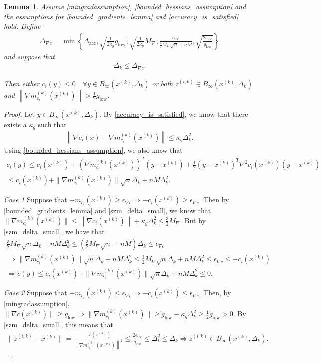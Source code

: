 \documentclass{article}
\newtheorem{lemma}[theorem]{Lemma}
\theoremstyle{case}
\newcommand{\dacc}{{\Delta_{\text{acc}}}}
\newcommand{\dk}{\Delta_k}
\newcommand{\gmcik}{{\nabla m_{c_i}^{(k)}\left(\xk\right)}}
\newcommand{\maxgrad}{{M_{\nabla}}}
\newcommand{\mingraddelta}{{\Delta_{\nabla c}}}
\newcommand{\mingradepsilon}{{\epsilon_{\nabla c}}}
\newcommand{\mingrad}{{ g_{\text{low}} }}
\newcommand{\tr}{{ B_{\infty}\left(\xk, \dk\right) }}
\newcommand{\xk}{{x^{(k)}}}
\newcommand{\zik}{{z^{(i, k)}}}
\begin{document}
\begin{lemma}
\label{only_small_z_matters}
Assume \cref{mingradassumption}, \cref{bounded_hessians_assumption}
and the assumptions for \cref{bounded_gradients_lemma} and \cref{accuracy_is_satisfied} hold.
Define
\begin{align}
\mingraddelta = \min\left\{
\dacc,
\sqrt{\frac 1 {2\kappa_g} \mingrad},
\sqrt{\frac 1 {2\kappa_g} \maxgrad},
\frac{\mingradepsilon}{\frac 3 2 \maxgrad\sqrt{n} + nM},
\sqrt{\frac{2\mingradepsilon}{\mingrad}}
\right\} \label{define_mingraddelta}
\end{align}
and suppose that
\begin{align}
\dk \le \mingraddelta \label{szm_delta_small}.
\end{align}

Then either $c_i(y) \le 0 \quad \forall y \in \tr$ or both $\zik \in \tr$ and $\left\|\gmcik\right\| > \frac 1 2 \mingrad$.
\end{lemma}

\begin{proof}
Let $y\in \tr$.
By \cref{accuracy_is_satisfied}, we know that there exists a $\kappa_g$ such that
\begin{align*}
\left\|\nabla c_i(x) - \gmcik\right\| \le \kappa_g \dk^2.
\end{align*}
Using \cref{bounded_hessians_assumption}, we also know that
\begin{align*}
c_i(y) \le c_i(\xk) + \left(\gmcik\right)^T(y - \xk) + \frac 1 2 \left(y - \xk\right)^T\nabla^2{c_i}(\xk)\left(y - \xk\right) \\
\le c_i(\xk) + \|\gmcik\|\sqrt{n}\dk +nM\dk^2.
\end{align*}

\emph{Case 1}
Suppose that $-m_{c_i}(\xk) \ge \mingradepsilon \Longrightarrow -c_i(\xk) \ge \mingradepsilon$.
Then  by \cref{bounded_gradients_lemma} and \cref{szm_delta_small}, we know that 
$\| \gmcik \| \le \left\|\nabla c_i(\xk)\right\| + \kappa_g \dk^2 \le \frac 3 2 \maxgrad$.
But by \cref{szm_delta_small}, we have that
\begin{align*}
\frac 3 2 \maxgrad\sqrt{n}\dk + nM\dk^2 \le \left(\frac 3 2 \maxgrad\sqrt{n} + nM\right)\dk \le \mingradepsilon \\
\Longrightarrow \|\gmcik\|\sqrt{n}\dk + nM\dk^2 \le \frac 3 2 \maxgrad\sqrt{n}\dk + nM\dk^2 \le \mingradepsilon \le -c_i(\xk)\\
\Longrightarrow c(y) \le c_i(\xk) + \|\gmcik\|\sqrt{n}\dk + nM\dk^2 \le 0.
\end{align*}

\emph{Case 2}
Suppose that $-m_{c_i}(\xk) \le \mingradepsilon \Longrightarrow -c_i(\xk) \le \mingradepsilon$.
Then, by \cref{mingradassumption}, $\|\nabla c(\xk) \| \ge \mingrad \Longrightarrow \|\gmcik\| \ge \mingrad - \kappa_g \dk^2 \ge \frac 1 2 \mingrad > 0$.
By \cref{szm_delta_small}, this means that 
\begin{align*}
\|\zik-\xk\| = \frac{-c(\xk)}{\left\|\gmcik\right\|^2} \le \frac{2\mingradepsilon}{\mingrad}\le \dk^2 \le \dk \Longrightarrow \zik \in \tr.
\end{align*}
\end{proof}
\end{document}
